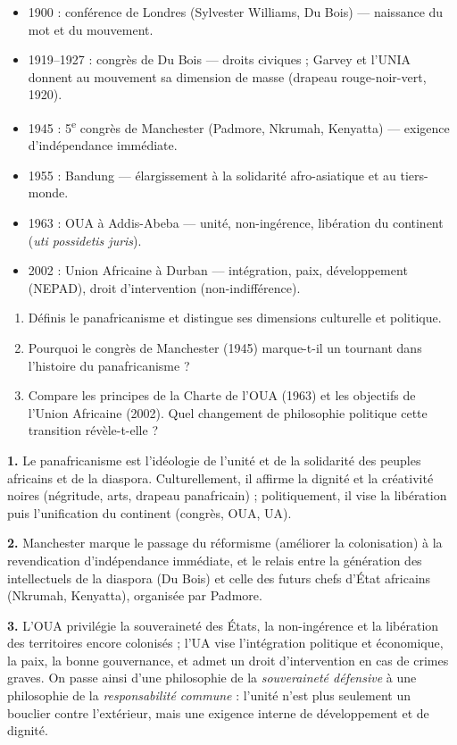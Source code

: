 \documentclass[11pt]{article}
\begin{document}
\begin{aretenir}
\begin{itemize}
\item 1900 : conférence de Londres (Sylvester Williams, Du Bois) — naissance du mot et du mouvement.
\item 1919--1927 : congrès de Du Bois — droits civiques ; Garvey et l'UNIA donnent au mouvement sa dimension de masse (drapeau rouge-noir-vert, 1920).
\item 1945 : 5\textsuperscript{e} congrès de Manchester (Padmore, Nkrumah, Kenyatta) — exigence d'indépendance immédiate.
\item 1955 : Bandung — élargissement à la solidarité afro-asiatique et au tiers-monde.
\item 1963 : OUA à Addis-Abeba — unité, non-ingérence, libération du continent (\emph{uti possidetis juris}).
\item 2002 : Union Africaine à Durban — intégration, paix, développement (NEPAD), droit d'intervention (non-indifférence).
\end{itemize}
\end{aretenir}

\begin{exercice}
\begin{enumerate}
\item Définis le panafricanisme et distingue ses dimensions culturelle et politique.
\item Pourquoi le congrès de Manchester (1945) marque-t-il un tournant dans l'histoire du panafricanisme ?
\item Compare les principes de la Charte de l'OUA (1963) et les objectifs de l'Union Africaine (2002). Quel changement de philosophie politique cette transition révèle-t-elle ?
\end{enumerate}
\end{exercice}

\begin{corrige}[Exercice]
\textbf{1.} Le panafricanisme est l'idéologie de l'unité et de la solidarité des peuples africains et de la diaspora. Culturellement, il affirme la dignité et la créativité noires (négritude, arts, drapeau panafricain) ; politiquement, il vise la libération puis l'unification du continent (congrès, OUA, UA).

\textbf{2.} Manchester marque le passage du réformisme (améliorer la colonisation) à la revendication d'indépendance immédiate, et le relais entre la génération des intellectuels de la diaspora (Du Bois) et celle des futurs chefs d'État africains (Nkrumah, Kenyatta), organisée par Padmore.

\textbf{3.} L'OUA privilégie la souveraineté des États, la non-ingérence et la libération des territoires encore colonisés ; l'UA vise l'intégration politique et économique, la paix, la bonne gouvernance, et admet un droit d'intervention en cas de crimes graves. On passe ainsi d'une philosophie de la \emph{souveraineté défensive} à une philosophie de la \emph{responsabilité commune} : l'unité n'est plus seulement un bouclier contre l'extérieur, mais une exigence interne de développement et de dignité.
\end{corrige}
\end{document}
